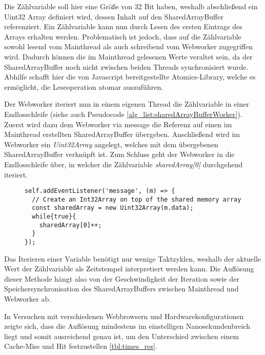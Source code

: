 Die Zählvariable soll hier eine Größe von 32 Bit haben, weshalb abschließend ein Uint32 Array definiert wird, dessen Inhalt auf den SharedArrayBuffer referenziert. 
Ein Zählvariable kann nun durch Lesen des ersten Eintrags des Arrays erhalten werden. 
Problematisch ist jedoch, dass auf die Zählvariable sowohl lesend vom Mainthread als auch schreibend vom Webworker zugegriffen wird. 
Dadurch können die im Mainthread gelesenen Werte veraltet sein, da der SharedArrayBuffer noch nicht zwischen beiden Threads synchronisiert wurde. 
Abhilfe schafft hier die von Javascript bereitgestellte Atomics-Library, welche es ermöglicht, die Leseoperation atomar auszuführen.

Der Webworker iteriert nun in einem eigenen Thread die Zählvariable in einer Endlosschleife (siehe auch Pseudocode \ref{alg_list:sharedArrayBufferWorker}). 
Zuerst wird dazu dem Webworker via message die Referenz auf einen im Mainthread erstellten SharedArrayBuffer übergeben.
Anschließend wird im Webworker ein \textit{Uint32Array} angelegt, welches mit dem übergebenen SharedArrayBuffer verknüpft ist. 
Zum Schluss geht der Webworker in die Endlosschleife über, in welcher die Zählvariable \textit{sharedArray[0]} durchgehend iteriert.

\begin{figure}[h]
\begin{lstlisting}[caption=counterWebworker.js: Webworker welcher die Zählvariable in einer Endlosschleife iteriert,label=alg_list:sharedArrayBufferWorker]
self.addEventListener('message', (m) => {
  // Create an Int32Array on top of the shared memory array 
  const sharedArray = new Uint32Array(m.data);
  while{true}{
    sharedArray[0]++;
  }
});
\end{lstlisting}
\end{figure}

Das Iterieren einer Variable benötigt nur wenige Taktzyklen, weshalb der aktuelle Wert der Zählvariable als Zeitstempel interpretiert werden kann. 
Die Auflösung dieser Methode hängt also von der Geschwindigkeit der Iteration sowie der Speichersynchronisation des SharedArrayBuffers zwischen Mainthread und Webworker ab.

In Versuchen mit verschiedenen Webbrowsern und Hardwarekonfigurationen zeigte sich, dass die Auflösung mindestens im einstelligen Nanosekundenbreich liegt und somit ausreichend genau ist, um den Unterschied zwischen einem Cache-Miss und Hit festzustellen \ref{tbl:times_res}.

